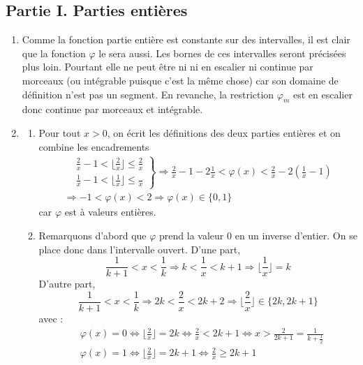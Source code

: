 \subsection*{Partie I. Parties entières}
\begin{enumerate}
 \item Comme la fonction partie entière est constante sur des intervalles, il est clair que la fonction $\varphi$ le sera aussi. Les bornes de ces intervalles seront précisées plus loin. Pourtant elle ne peut être ni ni en escalier ni continue par morceaux (ou intégrable puisque c'est la même chose) car son domaine de définition n'est pas un segment. En revanche, la restriction $\varphi_m$ est en escalier donc continue par morceaux et intégrable.
 \item
\begin{enumerate}
 \item Pour tout $x>0$, on écrit les définitions des deux parties entières et on combine les encadrements
\begin{multline*}
 \left. 
\begin{aligned}
 &\frac{2}{x}-1 < \lfloor \frac{2}{x} \rfloor \leq \frac{2}{x}\\
 &\frac{1}{x}-1 < \lfloor \frac{1}{x} \rfloor \leq \frac{}{x}
\end{aligned}
\right\rbrace
\Rightarrow \frac{2}{x}-1 -2\frac{1}{x}<\varphi(x)<\frac{2}{x}-2(\frac{1}{x}-1)\\
\Rightarrow -1 <\varphi(x) <2 \Rightarrow \varphi(x)\in\{0,1\} 
\end{multline*}
car $\varphi$ est à valeurs entières.
 \item Remarquons d'abord que $\varphi$ prend la valeur $0$ en un inverse d'entier. On se place donc dans l'intervalle ouvert. D'une part, 
\begin{displaymath}
 \frac{1}{k+1}<x<\frac{1}{k}\Rightarrow k< \frac{1}{x} < k+1 \Rightarrow \lfloor \frac{1}{x} \rfloor = k
\end{displaymath}
D'autre part,
\begin{displaymath}
 \frac{1}{k+1}<x<\frac{1}{k}\Rightarrow 2k< \frac{2}{x} < 2k+2 \Rightarrow \lfloor \frac{2}{x} \rfloor \in \{ 2k,2k+1\}
\end{displaymath}
avec :
\begin{align*}
 &\varphi(x)=0\Leftrightarrow\lfloor \frac{2}{x} \rfloor=2k \Leftrightarrow \frac{2}{x}<2k+1
\Leftrightarrow x>\frac{2}{2k+1}=\frac{1}{k+\frac{1}{2}}\\
 &\varphi(x)=1 \Leftrightarrow \lfloor \frac{2}{x} \rfloor=2k+1 \Leftrightarrow \frac{2}{x}\geq 2k+1

\end{align*}
\end{enumerate}
\end{enumerate}
